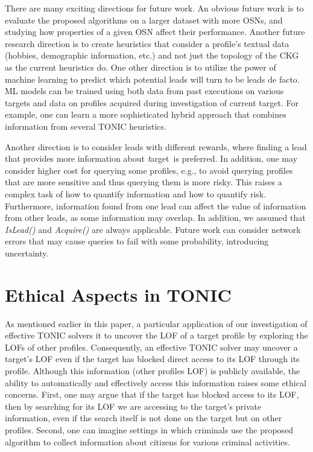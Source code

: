 \documentclass[journal]{IEEEtran}
\newcommand{\islead}[1]{{\em IsLead(#1)}}
\newcommand{\acquire}[1]{{\em Acquire(#1)}}
\newcommand{\target}{{\textit target}}
\begin{document}


There are many exciting directions for future work.
An obvious future work is to evaluate the proposed algorithms on a larger dataset with more OSNs, and studying how properties of a given OSN affect their performance. 
Another future research direction is to create heuristics that consider a profile's textual data (hobbies, demographic information, etc.) and not just the topology of the CKG as the current heuristics do.
One other direction is to utilize the power of machine learning to predict which potential leads will turn to be leads de facto.
ML models can be trained using both data from past executions on various targets and data on profiles acquired during investigation of current target. 
For example, one can learn a more sophisticated hybrid approach that combines information from several TONIC heuristics. 

Another direction is to consider leads with different rewards, where finding a lead that provides more information about \target\ is preferred. 
In addition, one may consider higher cost for querying some profiles, e.g., to avoid querying profiles that are more sensitive and thus querying them is more risky. This raises a complex task of how to quantify information and how to quantify risk. Furthermore, information found from one lead can affect the value of information from other leads, as some information may overlap. In addition, we assumed that \islead{} and \acquire{} are always applicable. Future work can consider network errors that may cause queries to fail with some probability, introducing uncertainty.




\section{Ethical Aspects in TONIC}
\label{sec:ethics}

As mentioned earlier in this paper, a particular application of our investigation of effective TONIC solvers it to uncover the LOF of a target profile 
by exploring the LOFs of other profiles. Consequently, an effective TONIC solver may uncover a target's LOF even if the target has blocked direct access to its LOF through its profile. Although this information (other profiles LOF) is publicly available, the ability to automatically and effectively access this information raises some ethical concerns. 
First, one may argue that if the target has blocked access to its LOF, then by searching for its LOF we are accessing to the target's private information, even if the search itself is not done on the target but on other profiles. 
Second, one can imagine settings in which criminals use the proposed algorithm to collect information about citizens for various criminal activities. 
\end{document}
